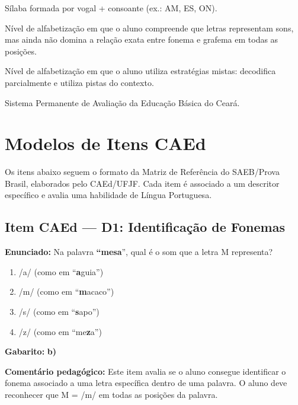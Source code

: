 \begin{description}[leftmargin=2.5cm, style=nextline]
  \item[Sílaba Indireta] S\'{i}laba formada por vogal + consoante
  (ex.: AM, ES, ON).

  \item[Sil\'{a}bico (n\'{i}vel)] N\'{i}vel de alfabetiza\c{c}\~{a}o
  em que o aluno compreende que letras representam sons, mas ainda
  n\~{a}o domina a rela\c{c}\~{a}o exata entre fonema e grafema em
  todas as posi\c{c}\~{o}es.

  \item[Sil\'{a}bico-Alfab\'{e}tico (n\'{i}vel)] N\'{i}vel de
  alfabetiza\c{c}\~{a}o em que o aluno utiliza estrat\'{e}gias mistas:
  decodifica parcialmente e utiliza pistas do contexto.

  \item[SPAECE] Sistema Permanente de Avalia\c{c}\~{a}o da Educa\c{c}\~{a}o
  B\'{a}sica do Ceará.

\end{description}


\chapter{Modelos de Itens CAEd}

Os itens abaixo seguem o formato da Matriz de Referência do SAEB/Prova Brasil,
elaborados pelo CAEd/UFJF. Cada item \'{e} associado a um descritor
espec\'{i}fico e avalia uma habilidade de L\'{i}ngua Portuguesa.

\section{Item CAEd --- D1: Identifica\c{c}\~{a}o de Fonemas}

\begin{exercicio}

\textbf{Enunciado:} Na palavra \textbf{``mesa}'', qual \'{e} o som
que a letra M representa?

\begin{enumerate}[label=\alph*)]
  \item /a/ (como em ``\textbf{a}guia'')
  \item /m/ (como em ``\textbf{m}acaco'')
  \item /s/ (como em ``\textbf{s}apo'')
  \item /z/ (como em ``me\textbf{z}a'')
\end{enumerate}

\textbf{Gabarito:} \textbf{b)}

\textbf{Coment\'{a}rio pedag\'{o}gico:} Este item avalia se o aluno
consegue identificar o fonema associado a uma letra espec\'{i}fica
dentro de uma palavra. O aluno deve reconhecer que M = /m/ em todas
as posi\c{c}\~{o}es da palavra.
\end{exercicio}

